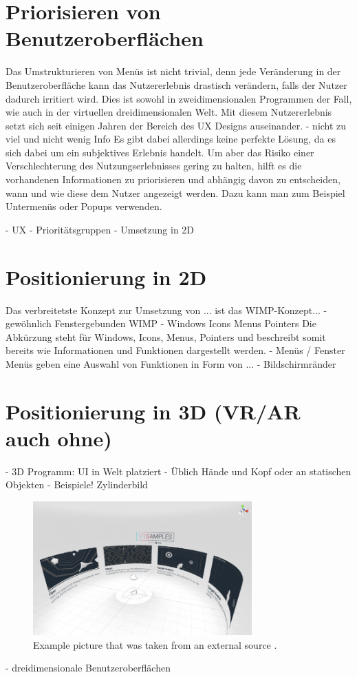 	\section{Priorisieren von Benutzeroberflächen}
		Das Umstrukturieren von Menüs ist nicht trivial, denn jede Veränderung in der Benutzeroberfläche kann das Nutzererlebnis drastisch verändern, falls der Nutzer dadurch irritiert wird. Dies ist sowohl in zweidimensionalen Programmen der Fall, wie auch in der virtuellen dreidimensionalen Welt. Mit diesem Nutzererlebnis setzt sich seit einigen Jahren der Bereich des UX Designs auseinander. 
		- nicht zu viel und nicht wenig Info
		Es gibt dabei allerdings keine perfekte Lösung, da es sich dabei um ein subjektives Erlebnis handelt.
		Um aber das Risiko einer Verschlechterung des Nutzungserlebnisses gering zu halten, hilft es die vorhandenen Informationen zu priorisieren und abhängig davon zu entscheiden, wann und wie diese dem Nutzer angezeigt werden. Dazu kann man zum Beispiel Untermenüs oder Popups  verwenden.
		
		- UX
		- Prioritätsgruppen
		- Umsetzung in 2D
		
	\section{Positionierung in 2D}
		Das verbreitetste Konzept zur Umsetzung von ... ist das WIMP-Konzept...
		- gewöhnlich Fenstergebunden WIMP
		- Windows Icons Menus Pointers
		Die Abkürzung steht für Windows, Icons, Menus, Pointers und beschreibt somit bereits wie Informationen und Funktionen dargestellt werden.
		- Menüs / Fenster
		Menüs geben eine Auswahl von Funktionen in Form von ...
		- Bildschirmränder
		
		
	\section{Positionierung in 3D (VR/AR auch ohne)}
		- 3D Programm: UI in Welt platziert
		- Üblich Hände und Kopf oder an statischen Objekten
		- Beispiele! Zylinderbild
		
		\begin{figure}[htbp]
			\centering
			\includegraphics[width=0.75\textwidth]{figures/cylinder_mapping.png}
			\caption{Example picture that was taken from an external source .}
			\label{fig:cylinder_mapping}
		\end{figure}
		- dreidimensionale Benutzeroberflächen